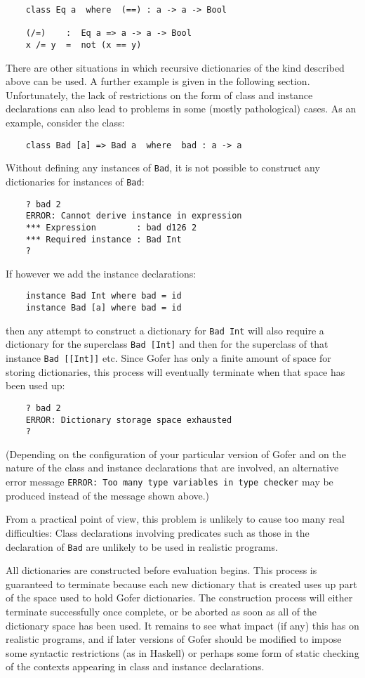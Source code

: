 \begin{verbatim}
    class Eq a  where  (==) : a -> a -> Bool

    (/=)    :  Eq a => a -> a -> Bool
    x /= y  =  not (x == y)
\end{verbatim}
There are other situations in which recursive dictionaries of the  kind
described above can be  used.   A  further  example  is  given  in  the
following section.  Unfortunately, the lack of restrictions on the form
of class and instance declarations can also lead to  problems  in  some
(mostly pathological) cases.  As an example, consider the class:
\begin{verbatim}
    class Bad [a] => Bad a  where  bad : a -> a
\end{verbatim}
Without defining any instances of \verb"Bad", it is not possible to  construct
any dictionaries for instances of \verb"Bad":
\begin{verbatim}
    ? bad 2
    ERROR: Cannot derive instance in expression
    *** Expression        : bad d126 2
    *** Required instance : Bad Int
    ?
\end{verbatim}
If however we add the instance declarations:
\begin{verbatim}
    instance Bad Int where bad = id
    instance Bad [a] where bad = id
\end{verbatim}
then any attempt to construct  a  dictionary  for  \verb"Bad Int"  will  also
require a dictionary for the superclass \verb"Bad [Int]"  and  then  for  the
superclass of that instance \verb"Bad [[Int]]" etc.  Since Gofer has only  a
finite amount of space for  storing  dictionaries,  this  process  will
eventually terminate when that space has been used up:
\begin{verbatim}
    ? bad 2
    ERROR: Dictionary storage space exhausted
    ?
\end{verbatim}
(Depending on the configuration of your  particular  version  of
Gofer and on the nature of the class and instance declarations that are
involved, an alternative error message {\tt ERROR: Too many type  variables
in type checker} may be produced instead of the message shown above.)

From a practical point of view, this problem is unlikely to  cause  too
many real difficulties:
\BI
\IT  Class declarations involving  predicates  such  as  those  in  the
     declaration of \verb"Bad" are unlikely to be used in realistic programs.

\IT  All dictionaries are constructed before evaluation  begins.   This
     process is guaranteed to terminate  because  each  new  dictionary
     that is created uses up part of  the  space  used  to  hold  Gofer
     dictionaries.  The  construction  process  will  either  terminate
     successfully once complete, or be aborted as soon as  all  of  the
     dictionary space has been used.
\EI
It remains to see what impact (if any) this has on realistic  programs,
and if later versions of  Gofer  should  be  modified  to  impose  some
syntactic restrictions (as in Haskell) or perhaps some form  of  static
checking of the contexts appearing in class and instance  declarations.


